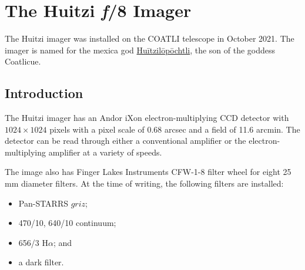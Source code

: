
\chapter{The Huitzi \/{\textit f}/8 Imager}
\label{appendix:instrument-huitzi-f8}

The Huitzi imager was installed on the COATLI telescope in October 2021. The imager is named for the mexica god \href{https://en.wikipedia.org/wiki/Huītzilōpōchtli}{Huītzilōpōchtli}, the son of the goddess Coatlicue.

\section{Introduction}

The Huitzi imager has an Andor iXon electron-multiplying CCD detector with $1024\times1024$ pixels with a pixel scale of 0.68 arcsec and a field of 11.6 arcmin. The detector can be read through either a conventional amplifier or the electron-multiplying amplifier at a variety of speeds.

The image also has Finger Lakes Instruments CFW-1-8 filter wheel for eight 25 mm diameter filters. At the time of writing, the following filters are installed:
\begin{itemize}
    \item Pan-STARRS $griz$;
    \item 470/10, 640/10 continuum;
    \item 656/3 H$\alpha$; and
    \item a dark filter.
\end{itemize}


